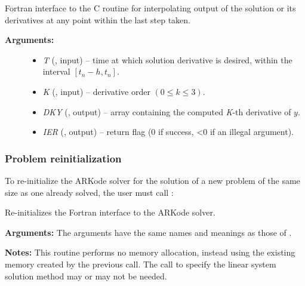 \documentclass[letterpaper,10pt,english]{sphinxmanual}
\begin{document}
\begin{fulllineitems}
\label{f_interface/Usage:f/_/FARKDKY}
Fortran interface to the C routine  for
interpolating output of the solution or its derivatives at any
point within the last step taken.
\begin{description}
\item[{\textbf{Arguments:}}] \leavevmode\begin{itemize}
\item {} 
\emph{T} (, input) -- time at which solution derivative
is desired, within the interval $[t_n-h,t_n]$.

\item {} 
\emph{K} (, input) -- derivative order $(0 \le k \le 3)$.

\item {} 
\emph{DKY} (, output) -- array containing the computed
\emph{K}-th derivative of $y$.

\item {} 
\emph{IER} (, output) -- return flag (0 if success, \textless{}0 if an
illegal argument).

\end{itemize}

\end{description}

\end{fulllineitems}



\subsubsection{Problem reinitialization}
\label{f_interface/Usage:finterface-reinit}\label{f_interface/Usage:problem-reinitialization}
To re-initialize the ARKode solver for the solution of a new
problem of the same size as one already solved, the user must call
{\hyperref[f_interface/Usage:f/_/FARKREINIT]{}}:

\begin{fulllineitems}
\label{f_interface/Usage:f/_/FARKREINIT}
Re-initializes the Fortran interface to the ARKode solver.

\textbf{Arguments:}  The arguments have the same names and meanings as those of
{\hyperref[f_interface/Usage:f/_/FARKMALLOC]{}}.

\textbf{Notes:}
This routine performs no memory allocation, instead using the
existing memory created by the previous {\hyperref[f_interface/Usage:f/_/FARKMALLOC]{}}
call.  The call to specify the linear system solution method may
or may not be needed.

\end{fulllineitems}
\end{document}
